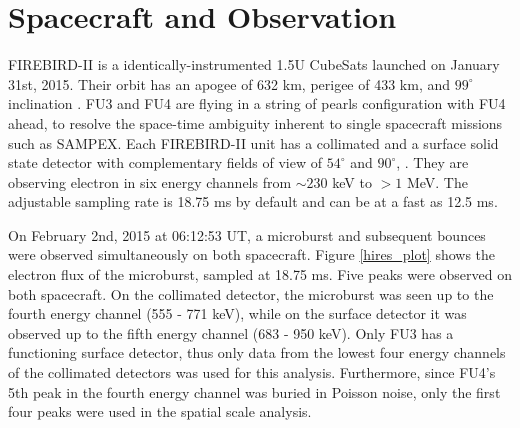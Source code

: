 \documentclass[draft, linenumbers]{agujournal}
\begin{document}
\section{Spacecraft and Observation} \label{obs} %
FIREBIRD-II is a  identically-instrumented  1.5U CubeSats  launched on January 31st, 2015. Their orbit has an apogee of 632 km, perigee of 433 km, and $99^{\circ}$ inclination \citep{Crew2016}. FU3 and FU4 are flying in a string of pearls configuration with FU4 ahead, to resolve the space-time ambiguity inherent to single spacecraft missions such as SAMPEX. Each FIREBIRD-II unit has a collimated and a surface solid state detector with complementary fields of view of $54^{\circ}$ and $90^{\circ}$, . They are observing electron  in six energy channels from $\sim 230$ keV to $> 1$ MeV. The adjustable sampling rate is 18.75 ms by default and can be at a fast as 12.5 ms. 

On February 2nd, 2015 at 06:12:53 UT, a microburst and subsequent bounces were observed simultaneously on both spacecraft. Figure \ref{hires_plot} shows the  electron flux of the microburst, sampled at 18.75 ms. Five peaks were observed on both spacecraft. On the collimated detector, the microburst was seen up to the fourth energy channel (555 - 771 keV), while on the surface detector it was observed up to the fifth energy channel (683 - 950 keV). Only FU3 has a functioning surface detector, thus only data from the lowest four energy channels of the collimated detectors was used for this analysis. Furthermore, since FU4's 5th peak in the fourth energy channel was buried in Poisson noise, only the first four peaks were used in the spatial scale analysis.
\end{document}
